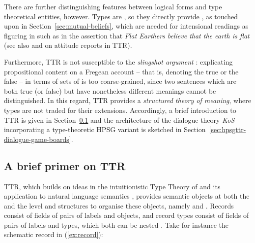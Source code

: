 \documentclass[output=paper
 	        ,biblatex
                ,babelshorthands
                ,newtxmath
                ,draftmode
                ,colorlinks, citecolor=brown
]{langscibook}
\begin{document}
There are further distinguishing features between logical forms and type theoretical entities, however.
%
Types are , so they directly provide , as touched upon in Section~\ref{sec:mutual-beliefs}, which are needed for intensional readings as figuring in  such as in the assertion that \textit{Flat Earthers believe that the earth is flat} (see also \citealt{Cooper:2005:b} and \citealt{Cooper:ms} on attitude reports in TTR).


Furthermore, TTR is not susceptible to the \emph{slingshot argument} \citep[--26]{Barwise:Perry:1983}: explicating propositional content on a Fregean account \citep{Frege:1892} -- that is, denoting the true or the false -- in terms of sets of  is too coarse-grained, since two sentences which are both true (or false) but have nonetheless different meanings cannot be distinguished.
%
In this regard, TTR provides a \emph{structured theory of meaning}, where types are not traded for their extensions.
%
Accordingly, a brief introduction to TTR is given in Section~\ref{sec:brief-primer-ttr} and the architecture of the dialogue theory \emph{KoS} incorporating a type-theoretic HPSG variant is sketched in Section~\ref{sec:hpsgttr-dialogue-game-boards}.




\subsection{A brief primer on TTR}
\label{sec:brief-primer-ttr}

TTR, which builds on ideas in the intuitionistic Type Theory of \citet{Martin-Loef:1984} and its application to natural language semantics \citep[see][]{Ranta:2015}, provides semantic objects at both the  and the  level and structures to organise these objects, namely  and  %
\citetext{see \citealp{Cooper:2005:a}, \citealp{Cooper:2005:b}, \citealp{Cooper:2012}, \citealp{Cooper:2017:a}, and \citealp{Cooper:Ginzburg:2015} for expositions}. 
%
Records consist of fields of pairs of labels and objects, and record types consist of fields of pairs of labels and types, which both can be nested \citep{Cooper:ms}.
%
%
Take for instance the schematic record in (\ref{ex:record}):
%
\ea \label{ex:record}
\avm{
[$l_0$ & = [$l_1$ & = $o_1$ \\
			$l_2$ & = $o_2$] \\
$l_3$ & = $o_3$]
}
\z
\end{document}
